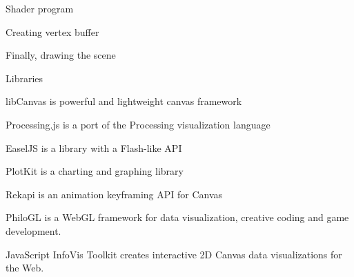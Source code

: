 \documentclass{beamer}
\begin{document}
\begin{frame}{Shader program}



\end{frame}


\begin{frame}{Creating vertex buffer}



\end{frame}


\begin{frame}{Finally, drawing the scene}



\end{frame}


\begin{frame}{Libraries}

libCanvas is powerful and lightweight canvas framework

Processing.js is a port of the Processing visualization language

EaselJS is a library with a Flash-like API

PlotKit is a charting and graphing library

Rekapi is an animation keyframing API for Canvas

PhiloGL is a WebGL framework for data visualization, creative coding and game development.

JavaScript InfoVis Toolkit creates interactive 2D Canvas data visualizations for the Web.


\end{frame}
\end{document}
